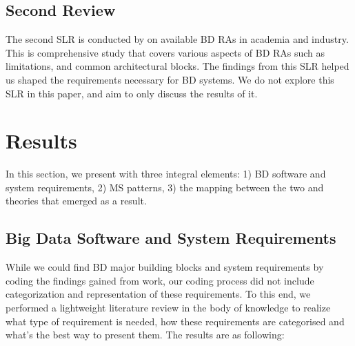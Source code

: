 \documentclass[a4paper,11pt,article,oneside]{memoir}
\begin{document}



\section{Second Review}

The second SLR is conducted by \citet{ataei2022state} on available BD RAs in academia and industry. This is comprehensive study that covers various aspects of BD RAs such as limitations, and common architectural blocks. The findings from this SLR helped us shaped the requirements necessary for BD systems. We do not explore this SLR in this paper, and aim to only discuss the results of it.






\chapter{Results}


In this section, we present with three integral elements: 1) BD software and system requirements, 2) MS patterns, 3) the mapping between the two and theories that emerged as a result.  

\section{Big Data Software and System Requirements}\label{requirements}

While we could find BD major building blocks and system requirements by coding the findings gained from \citet{ataei2022state} work, our coding process did not include categorization and representation of these requirements. To this end, we performed a lightweight literature review in the body of knowledge to realize what type of requirement is needed, how these requirements are categorised and what's the best way to present them. The results are as following:
\end{document}
